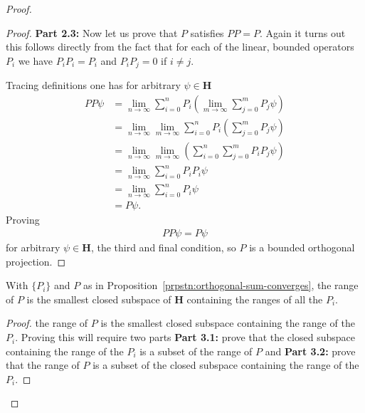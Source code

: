 \begin{proof}
\begin{proof}
\textbf{Part 2.3:} Now let us prove that $P$ satisfies $PP=P$. Again it turns out this follows directly from the fact that for each of the linear, bounded operators $P_i$ we have $P_iP_i = P_i$ and $P_iP_j = 0$ if $i \neq j$.

Tracing definitions one has for arbitrary $\psi \in \mathbf{H}$
\begin{align}
    PP\psi &= \lim\limits_{n \rightarrow \infty} \sum_{i = 0}^n P_i \left( \lim\limits_{m \rightarrow \infty} \sum_{j = 0}^m P_j\psi \right) \\
           &= \lim\limits_{n \rightarrow \infty}  \lim\limits_{m \rightarrow \infty} \sum_{i = 0}^n P_i \left( \sum_{j = 0}^m P_j\psi \right) \\
           &= \lim\limits_{n \rightarrow \infty}  \lim\limits_{m \rightarrow \infty} \left( \sum_{i = 0}^n \sum_{j = 0}^m P_i P_j\psi \right) \\
           &= \lim\limits_{n \rightarrow \infty}  \sum_{i = 0}^n P_i P_i\psi \\
           &= \lim\limits_{n \rightarrow \infty}  \sum_{i = 0}^n P_i\psi \\
           &= P\psi.
\end{align}
Proving
\begin{align}
    PP\psi = P\psi
\end{align}
for arbitrary $\psi \in \mathbf{H}$, the third and final condition, so $P$ is a bounded orthogonal projection.
\end{proof}

\begin{proposition}
    \label{prpstn:orthogonal-sum-range}
    \leanok
    With $\{P_i\}$ and $P$ as in Proposition~\ref{prpstn:orthogonal-sum-converges}, the range of $P$ is the smallest closed subspace of $\mathbf{H}$ containing the ranges of all the $P_i$.
\end{proposition}
\begin{proof}
    \leanok
the range of $P$ is the smallest closed subspace containing the range of the $P_i$. Proving this will require two parts \textbf{Part 3.1:} prove that the closed subspace containing the range of the $P_i$ is a subset of the range of $P$ and \textbf{Part 3.2:} prove that the range of $P$ is a subset of the closed subspace containing the range of the $P_i$.


\end{proof}
\end{proof}
